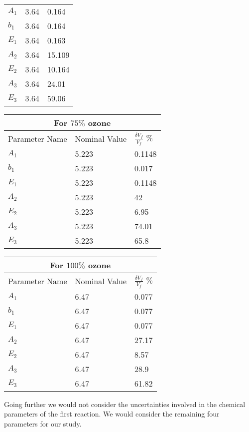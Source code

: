\begin{table}[H]
\begin{center}
\begin{tabular}{ |p{3cm}|p{3cm}|p{3cm}| }
 \hline
    $A_1$      &  3.64   &  0.164   \\
    $b_1$      &  3.64   &  0.164    \\
    $E_1$      &  3.64   &  0.163     \\
    $A_2$      &  3.64   &  15.109       \\       
    $E_2$      &  3.64   &   10.164    \\
    $A_3$      &  3.64   &   24.01   \\       
    $E_3$      &  3.64   &   59.06   \\
    \hline
\end{tabular}
\newline
\vspace*{0.7 cm}
\newline
  \begin{tabular}{ |p{3cm}|p{3cm}|p{3cm}| }
 \hline
 \multicolumn{3}{|c|}{For $75\%$ ozone} \\
 \hline
 Parameter Name   & Nominal Value  & $\frac{\delta V_f}{V_f}$ $\%$ \\
 \hline
    $A_1$      &  5.223   &  0.1148   \\
    $b_1$      &  5.223   &  0.017   \\
    $E_1$      &  5.223   &  0.1148     \\
    $A_2$      &  5.223   &  42       \\       
    $E_2$      &  5.223   &   6.95    \\
    $A_3$      &  5.223   &   74.01   \\       
    $E_3$      &  5.223   &   65.8   \\
    \hline
\end{tabular}
\newline
\vspace*{0.7 cm}
\newline
\begin{tabular}{ |p{3cm}|p{3cm}|p{3cm}| }
 \hline
 \multicolumn{3}{|c|}{For $100\%$ ozone} \\
 \hline
 Parameter Name   & Nominal Value  & $\frac{\delta V_f}{V_f}$ $\%$ \\
 \hline
    $A_1$      &  6.47   &  0.077   \\
    $b_1$      &  6.47   &  0.077   \\
    $E_1$      &  6.47   &  0.077     \\
    $A_2$      &  6.47  &    27.17       \\       
    $E_2$      &  6.47   &   8.57    \\
    $A_3$      &  6.47   &   28.9   \\       
    $E_3$      &  6.47   &   61.82   \\
  \hline
\end{tabular}
 \end{center}
\end{table}
     

 Going further we would not consider the uncertainties involved in the
 chemical parameters of the first reaction. We would consider the
 remaining four parameters for our study.
